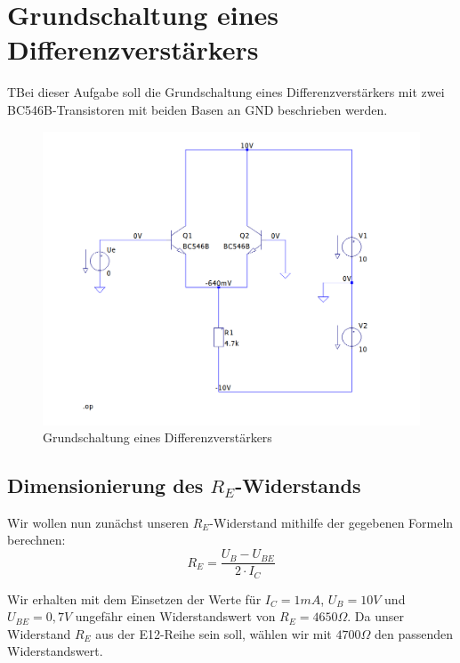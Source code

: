 \documentclass{article}
\begin{document}
\tableofcontents

\listoffigures
\newpage


\section{Grundschaltung eines Differenzverstärkers}
\begin{task}
  TBei dieser Aufgabe soll die Grundschaltung eines Differenzverstärkers mit zwei BC546B-Transistoren mit beiden Basen an GND beschrieben werden.
\end{task}

\begin{figure}[h]
  \centering
  \includegraphics[scale=0.5]{../assets/images/EL2P1/aufgabe1schalt.png}
  \caption[Grundschaltung der Differenzverstärker]{Grundschaltung eines Differenzverstärkers}
  \label{fig:schalt1}
\end{figure}

\subsection{Dimensionierung des $R_E$-Widerstands}
\label{sec:RE}

Wir wollen nun zunächst unseren $R_E$-Widerstand mithilfe der gegebenen Formeln \cite{skript} berechnen:
\begin{equation}
 R_E = \frac{U_B-U_{BE}}{2\cdot I_C}
\end{equation}

Wir erhalten mit dem Einsetzen der Werte für $I_C = 1mA$, $U_B = 10V$ und $U_{BE} = 0,7V$ ungefähr
einen Widerstandswert von $R_E = 4650\Omega$. Da unser Widerstand $R_E$ aus der E12-Reihe sein soll,
wählen wir mit $4700\Omega$ den passenden Widerstandswert.
\newpage
\end{document}
